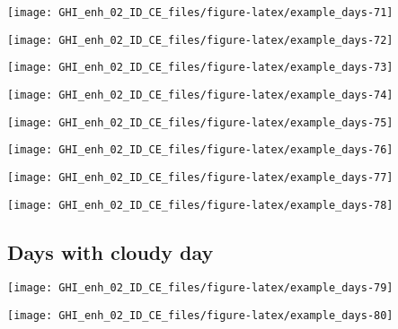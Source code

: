 \documentclass[
  10pt,
  a4paper,oneside]{article}
\begin{document}
\begin{center}\texttt{[image: GHI\_enh\_02\_ID\_CE\_files/figure-latex/example\_days-71]} \end{center}

\begin{center}\texttt{[image: GHI\_enh\_02\_ID\_CE\_files/figure-latex/example\_days-72]} \end{center}

\begin{center}\texttt{[image: GHI\_enh\_02\_ID\_CE\_files/figure-latex/example\_days-73]} \end{center}

\begin{center}\texttt{[image: GHI\_enh\_02\_ID\_CE\_files/figure-latex/example\_days-74]} \end{center}

\begin{center}\texttt{[image: GHI\_enh\_02\_ID\_CE\_files/figure-latex/example\_days-75]} \end{center}

\begin{center}\texttt{[image: GHI\_enh\_02\_ID\_CE\_files/figure-latex/example\_days-76]} \end{center}

\begin{center}\texttt{[image: GHI\_enh\_02\_ID\_CE\_files/figure-latex/example\_days-77]} \end{center}

\begin{center}\texttt{[image: GHI\_enh\_02\_ID\_CE\_files/figure-latex/example\_days-78]} \end{center}

\FloatBarrier

\hypertarget{days-with-cloudy-day}{%
\subsection{Days with cloudy day}\label{days-with-cloudy-day}}

\begin{center}\texttt{[image: GHI\_enh\_02\_ID\_CE\_files/figure-latex/example\_days-79]} \end{center}

\begin{center}\texttt{[image: GHI\_enh\_02\_ID\_CE\_files/figure-latex/example\_days-80]} \end{center}
\end{document}
